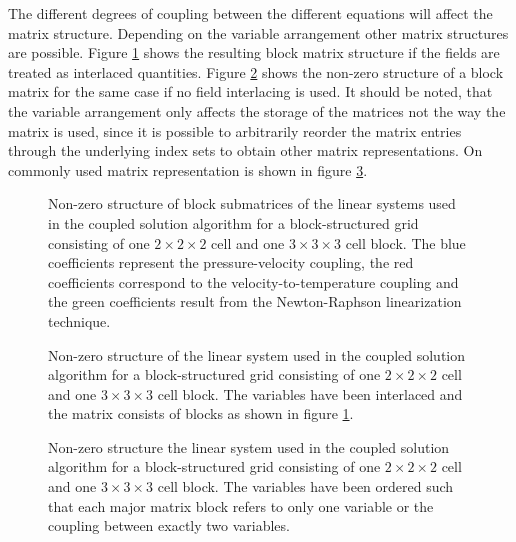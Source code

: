 The different degrees of coupling between the different equations will affect the matrix structure. Depending on the variable arrangement other matrix structures are possible. Figure \ref{fig:cpldassemble} shows the resulting block matrix structure if the fields are treated as interlaced quantities. Figure \ref{fig:interlacemat} shows the non-zero structure of a block matrix for the same case if no field interlacing is used. It should be noted, that the variable arrangement only affects the storage of the matrices not the way the matrix is used, since it is possible to arbitrarily reorder the matrix entries through the underlying index sets to obtain other matrix representations. On commonly used matrix representation is shown in figure \ref{fig:nointerlacemat}.

\begin{figure}
  \centering
  \label{fig:cpldassemble}
  
  \caption{Non-zero structure of block submatrices of the linear systems used in the coupled solution algorithm for a block-structured grid consisting of one $2\times2\times2$ cell and one $3\times3\times3$ cell block. The blue coefficients represent the pressure-velocity coupling, the red coefficients correspond to the velocity-to-temperature coupling and the green coefficients result from the Newton-Raphson linearization technique.}
\end{figure}

\begin{figure}
  \centering
  \label{fig:interlacemat}
  
  \caption{Non-zero structure of the linear system used in the coupled solution algorithm for a block-structured grid consisting of one $2\times2\times2$ cell and one $3\times3\times3$ cell block. The variables have been interlaced and the matrix consists of blocks as shown in figure \ref{fig:cpldassemble}.}
\end{figure}

\begin{figure}
  \centering
  \label{fig:nointerlacemat}
   
  \caption{Non-zero structure the linear system used in the coupled solution algorithm for a block-structured grid consisting of one $2\times2\times2$ cell and one $3\times3\times3$ cell block. The variables have been ordered such that each major matrix block refers to only one variable or the coupling between exactly two variables.}
  \label{fig:nointerlacemat}
\end{figure}
